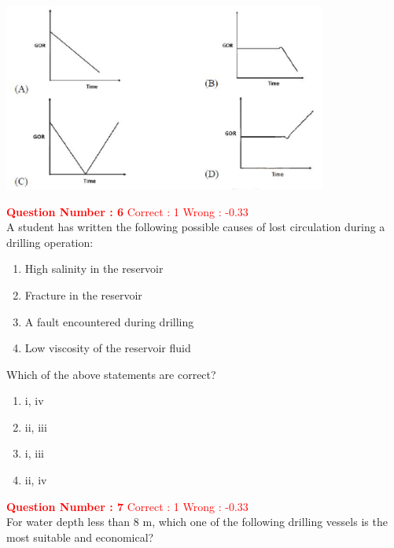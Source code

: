\documentclass[12pt]{article}
\begin{document}
{\begin{center}
    \includegraphics[width=0.8\textwidth]{Figs/GraphQ _5.png} 
\end{center}

\vspace{2ex}


\textbf{\textcolor{red}{Question Number : 6}} \hfill \textcolor{red}{Correct : 1  Wrong : -0.33} \\[1ex]
A student has written the following possible causes of lost circulation during a drilling operation:
\begin{enumerate}[label=\roman*.]
    \item High salinity in the reservoir \\
    \item Fracture in the reservoir \\
    \item A fault encountered during drilling \\
    \item Low viscosity of the reservoir fluid
\end{enumerate}
Which of the above statements are correct?

\begin{enumerate}[label=(\Alph*)]
    \item i, iv
    \item ii, iii
    \item i, iii
    \item ii, iv
\end{enumerate}

\vspace{2ex}

\newpage

\textbf{\textcolor{red}{Question Number : 7}} \hfill \textcolor{red}{Correct : 1  Wrong : -0.33} \\[1ex]
For water depth less than 8 m, which one of the following drilling vessels is the most suitable and economical?

}
\end{document}
